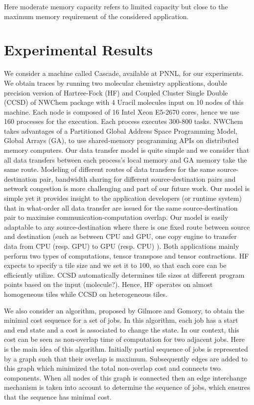 \documentclass[runningheads]{llncs} %
\begin{document}
Here moderate memory capacity refers to limited capacity but close to the maximum memory  requirement of the considered application.





	\section{Experimental Results}
	\label{sec:exp}
	
	
	We consider a machine called Cascade, available at PNNL, for our experiments. We obtain traces by running  two molecular chemistry applications,  double precision version of Hartree-Fock (HF) and Coupled Cluster Single Double (CCSD) of NWChem package with 4 Uracil molecules input on 10 nodes of this machine. Each node is composed of 16 Intel Xeon E5-2670 cores, hence we use 160 processes for the execution. Each process executes 300-800 tasks.  NWChem takes advantages of a Partitioned Global Address Space Programming Model, Global Arrays (GA), to use shared-memory programming APIs  on distributed memory computers.  Our data transfer model is quite simple and  we consider that all data transfers between each process's local memory and GA memory take the same route. Modeling of different routes of data transfers for the same source-destination pair, bandwidth sharing for different source-destination pairs and network congestion is more challenging and part of our future work. Our model is simple yet it provides insight to the application developers (or runtime system) that  in what-order all data transfer  are issued for the same source-destination pair to maximise communication-computation overlap. Our model is easily adaptable to any source-destination where there is one fixed route between source and destination (such as between CPU and GPU, one copy engine to transfer data from CPU (resp. GPU) to GPU (resp. CPU) ).
	Both applications mainly perform two types of computations, tensor transpose and tensor contractions.  HF expects to specify a tile size and we set it to 100, so that each core can be efficiently utilize.  CCSD automatically determines tile sizes at different program points based on the input (molecule?).  Hence, HF operates on almost homogeneous tiles while CCSD on heterogeneous tiles.
	
	We also consider an algorithm, proposed by Gilmore and Gomory, to obtain the minimal cost sequence for a set of jobs. In this algorithm, each job has a start and end state and a cost is associated to change the state. In our context, this cost can be seen as non-overlap time of computation for two adjacent jobs. Here is the main idea of this algorithm. Initially partial sequence of jobs is represented by a graph such that their overlap is maximum. Subsequently edges are added to this graph which minimized the total non-overlap cost  and connects two components. When all nodes of this graph is connected then an edge interchange mechanism is taken into account to determine the sequence of jobs, which ensures that the sequence has minimal cost.
	
\end{document}
